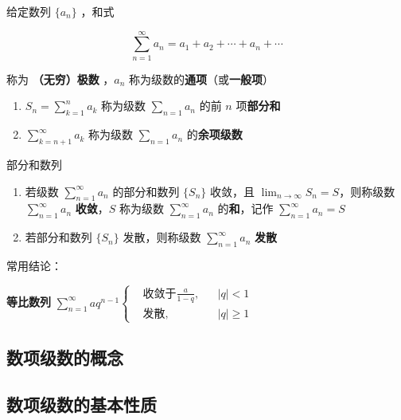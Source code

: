 \documentclass[lang = zh , final , oneside , openany , titlepage , zihao = -4 , linespread = 1.3 , baselineskip = false , cjk-font = windows , text-font = newtx , math-font = newtx , math-style = ISO , uppercase-greek = upright , integral-limits = false]{sjtureport}
\begin{document}
\begin{definition}
给定数列 \(\{a_n\}\) ，和式

\[\sum_{n=1}^{\infty} a_n = a_1 + a_2 + \cdots + a_n + \cdots\]

称为 \textbf{（无穷）极数} ，\(a_n\)
称为级数的\textbf{通项}（或\textbf{一般项}）
\end{definition}

\begin{enumerate}
\item
  \(\displaystyle S_n = \sum_{k=1}^n a_k\) 称为级数
  \(\displaystyle \sum_{n=1} a_n\) 的前 \(n\) 项\textbf{部分和}
\item
  \(\displaystyle\sum_{k=n+1}^\infty a_k\) 称为级数
  \(\displaystyle \sum_{n=1} a_n\) 的\textbf{余项级数}
\end{enumerate}

\begin{definition}
  部分和数列
\begin{enumerate}
\item
  若级数 \(\displaystyle\sum_{n=1}^\infty a_n\) 的部分和数列 \(\{S_n\}\)
  收敛，且 \(\displaystyle \lim_{n\to\infty}S_n = S\)，则称级数
  \(\displaystyle \sum_{n=1}^\infty a_n\) \textbf{收敛}，\(S\) 称为级数
  \(\displaystyle \sum_{n=1}^\infty a_n\) 的\textbf{和}，记作
  \(\displaystyle \sum_{n=1}^\infty a_n = S\)
\item
  若部分和数列 \(\{S_n\}\) 发散，则称级数
  \(\displaystyle \sum_{n=1}^\infty a_n\) \textbf{发散}
\end{enumerate}
\end{definition}

\begin{remark}
    常用结论：

\textbf{等比数列}
\(\displaystyle \sum_{n=1}^\infty aq^{n-1}\left\{\begin{aligned}&\text{收敛于}\frac{a}{1-q}  ,&&\vert q \vert < 1\\ &\text{发散}  ,&&\vert q \vert \geq 1\end{aligned}\right.\)
\end{remark}

\subsection{数项级数的概念}

\subsection{数项级数的基本性质}
\end{document}
